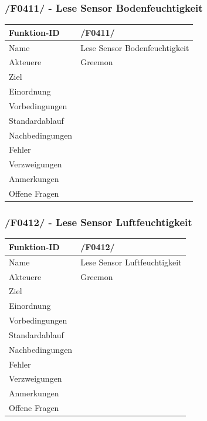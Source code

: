 \documentclass[pointlessnumbers]{scrartcl}
\begin{document}
 \subsubsection{/F0411/ - Lese Sensor Bodenfeuchtigkeit}
 \begin{tabular}{|p{\BreiteErsterTab}|p{\BreiteZweiterTab}|}\hline
    Funktion-ID &       /F0411/  
                        \\ \hline
    Name &              Lese Sensor Bodenfeuchtigkeit
                        \\ \hline
    Akteuere &          Greemon
                        \\ \hline
    Ziel &             
                        \\ \hline
    Einordnung &        
                        \\ \hline
    Vorbedingungen &    
                        \\ \hline
    Standardablauf &    
                        \\ \hline
    Nachbedingungen &   
                        \\ \hline
    Fehler &       
                        \\ \hline
    Verzweigungen &     
                        \\ \hline
    Anmerkungen &       
                        \\ \hline
    Offene Fragen &     
                        \\ \hline
 \end{tabular} 

 \subsubsection{/F0412/ - Lese Sensor Luftfeuchtigkeit}
 \begin{tabular}{|p{\BreiteErsterTab}|p{\BreiteZweiterTab}|}\hline
    Funktion-ID &       /F0412/  
                        \\ \hline
    Name &              Lese Sensor Luftfeuchtigkeit
                        \\ \hline
    Akteuere &          Greemon
                        \\ \hline
    Ziel &             
                        \\ \hline
    Einordnung &        
                        \\ \hline
    Vorbedingungen &    
                        \\ \hline
    Standardablauf &    
                        \\ \hline
    Nachbedingungen &   
                        \\ \hline
    Fehler &       
                        \\ \hline
    Verzweigungen &     
                        \\ \hline
    Anmerkungen &       
                        \\ \hline
    Offene Fragen &     
                        \\ \hline
 \end{tabular} 
 
\end{document}
